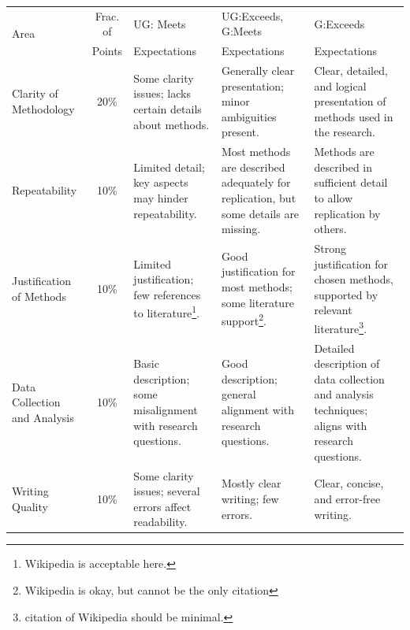 \documentclass[11pt]{article}
\begin{document}
\begin{landscape}
\begin{table}
    \centering
    \small
    \begin{tabular}{p{.75in} c  p{2.25in}  p{2.25in}  p{2.25in}}
        \multirow{2}{*}{Area}  	& Frac. of   	& UG: Meets		& UG:Exceeds, G:Meets   & G:Exceeds 	  \\
                           			    & Points & Expectations  & Expectations  		& Expectations \\
        \toprule
        Clarity of Methodology  & 20\%\vspace{.25in} 				& Some clarity issues; lacks certain details about methods. & Generally clear presentation; minor ambiguities present. & Clear, detailed, and logical presentation of methods used in the research. \\
        \midrule
        Repeatability         & 10\%\vspace{.25in}				& Limited detail; key aspects may hinder repeatability. & Most methods are described adequately for replication, but some details are missing. & Methods are described in sufficient detail to allow replication by others. \\
        \midrule
        Justification of Methods & 10\%\vspace{.25in}				& Limited justification; few references to literature\footnote{Wikipedia is acceptable here.}. & Good justification for most methods; some literature support\footnote{Wikipedia is okay, but cannot be the only citation}. & Strong justification for chosen methods, supported by relevant literature\footnote{citation of Wikipedia should be minimal.}. \\
        \midrule
        Data Collection and Analysis & 10\%\vspace{.25in}				& Basic description; some misalignment with research questions. & Good description; general alignment with research questions. & Detailed description of data collection and analysis techniques; aligns with research questions. \\
        \midrule
        Writing Quality 		& 10\%\vspace{.25in}				& Some clarity issues; several errors affect readability. & Mostly clear writing; few errors. & Clear, concise, and error-free writing. \\
        \bottomrule
    \end{tabular}
\end{table}
\end{landscape}
\end{document}

